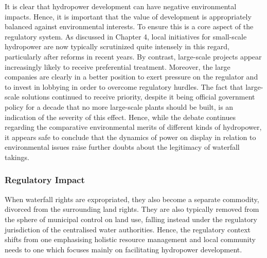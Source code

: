 It is clear that hydropower development can have negative environmental impacts. Hence, it is important that the value of development is appropriately balanced against environmental interests. To ensure this is a core aspect of the regulatory system. As discussed in Chapter 4, local initiatives for small-scale hydropower are now typically scrutinized quite intensely in this regard, particularly after reforms in recent years. By contrast, large-scale projects appear increasingly likely to receive preferential treatment. %
Moreover, the large companies are clearly in a better position to exert pressure on the regulator and to invest in lobbying in order to overcome regulatory hurdles. The fact that large-scale solutions continued to receive priority, despite it being official government policy for a decade that no more large-scale plants should be built, is an indication of the severity of this effect. Hence, while the debate continues regarding the comparative environmental merits of different kinds of hydropower, it appears safe to conclude that the dynamics of power on display in relation to environmental issues raise further doubts about the legitimacy of waterfall takings.


\subsubsection{Regulatory Impact}

When waterfall rights are expropriated, they also become a separate commodity, divorced from the surrounding land rights. They are also typically removed from the sphere of municipal control on land use, falling instead under the regulatory jurisdiction of the centralised water authorities. 
Hence, the regulatory context shifts from one emphasising holistic resource management and local community needs to one which focuses mainly on facilitating hydropower development.

